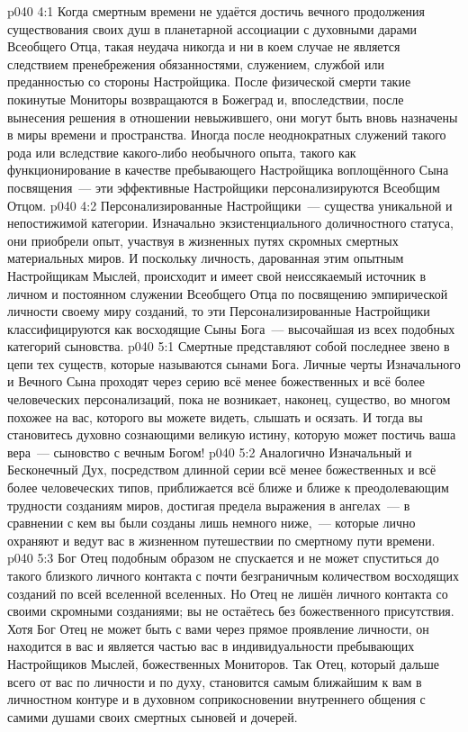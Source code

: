 \vs p040 4:1 Когда смертным времени не удаётся достичь вечного продолжения существования своих душ в планетарной ассоциации с духовными дарами Всеобщего Отца, такая неудача никогда и ни в коем случае не является следствием пренебрежения обязанностями, служением, службой или преданностью со стороны Настройщика. После физической смерти такие покинутые Мониторы возвращаются в Божеград и, впоследствии, после вынесения решения в отношении невыжившего, они могут быть вновь назначены в миры времени и пространства. Иногда после неоднократных служений такого рода или вследствие какого\hyp{}либо необычного опыта, такого как функционирование в качестве пребывающего Настройщика воплощённого Сына посвящения~--- эти эффективные Настройщики персонализируются Всеобщим Отцом.
\vs p040 4:2 Персонализированные Настройщики~--- существа уникальной и непостижимой категории. Изначально экзистенциального доличностного статуса, они приобрели опыт, участвуя в жизненных путях скромных смертных материальных миров. И поскольку личность, дарованная этим опытным Настройщикам Мыслей, происходит и имеет свой неиссякаемый источник в личном и постоянном служении Всеобщего Отца по посвящению эмпирической личности своему миру созданий, то эти Персонализированные Настройщики классифицируются как восходящие Сыны Бога~--- высочайшая из всех подобных категорий сыновства.
\vs p040 5:1 Смертные представляют собой последнее звено в цепи тех существ, которые называются сынами Бога. Личные черты Изначального и Вечного Сына проходят через серию всё менее божественных и всё более человеческих персонализаций, пока не возникает, наконец, существо, во многом похожее на вас, которого вы можете видеть, слышать и осязать. И тогда вы становитесь духовно сознающими великую истину, которую может постичь ваша вера~--- сыновство с вечным Богом!
\vs p040 5:2 Аналогично Изначальный и Бесконечный Дух, посредством длинной серии всё менее божественных и всё более человеческих типов, приближается всё ближе и ближе к преодолевающим трудности созданиям миров, достигая предела выражения в ангелах~--- в сравнении с кем вы были созданы лишь немного ниже,~--- которые лично охраняют и ведут вас в жизненном путешествии по смертному пути времени.
\vs p040 5:3 Бог Отец подобным образом не спускается и не может спуститься до такого близкого личного контакта с почти безграничным количеством восходящих созданий по всей вселенной вселенных. Но Отец не лишён личного контакта со своими скромными созданиями; вы не остаётесь без божественного присутствия. Хотя Бог Отец не может быть с вами через прямое проявление личности, он находится в вас и является частью вас в индивидуальности пребывающих Настройщиков Мыслей, божественных Мониторов. Так Отец, который дальше всего от вас по личности и по духу, становится самым ближайшим к вам в личностном контуре и в духовном соприкосновении внутреннего общения с самими душами своих смертных сыновей и дочерей.

